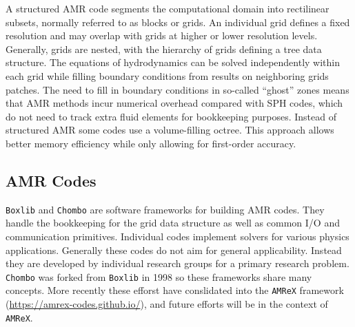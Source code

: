\documentclass[11pt,twoside]{article}
\begin{document}
A structured AMR code segments the computational domain into rectilinear subsets, normally referred to as blocks or grids. An individual grid defines a fixed resolution and may overlap with grids at higher or lower resolution levels. Generally, grids are nested, with the hierarchy of grids defining a tree data structure. The equations of hydrodynamics can be solved independently within each grid while filling boundary conditions from results on neighboring grids patches. The need to fill in boundary conditions in so-called ``ghost'' zones means that AMR methods incur numerical overhead compared with SPH codes, which do not need to track extra fluid elements for bookkeeping purposes. Instead of structured AMR some codes use a volume-filling octree. This approach allows better memory efficiency while only allowing for first-order accuracy.

\subsection{AMR Codes}

\texttt{Boxlib} \citep{zhang2016} and \texttt{Chombo} \citep{adams2015} are software frameworks for building AMR codes. They handle the bookkeeping for the grid data structure as well as common I/O and communication primitives. Individual codes implement solvers for various physics applications. Generally these codes do not aim for general applicability. Instead they are developed by individual research groups for a primary research problem. \texttt{Chombo} was forked from \texttt{Boxlib} in 1998 so these frameworks share many concepts. More recently these efforst have conslidated into the \texttt{AMReX} framework (\url{https://amrex-codes.github.io/}), and future efforts will be in the context of \texttt{AMReX}.
\end{document}
